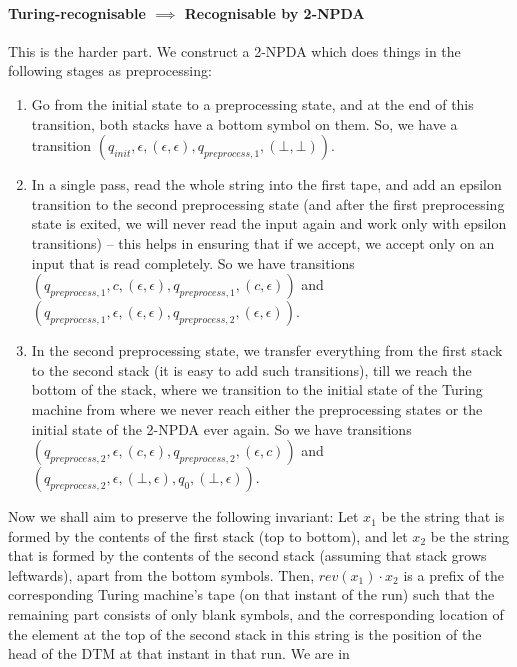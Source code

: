 \begin{soln}
    \paragraph{Turing-recognisable $\implies$ Recognisable by 2-NPDA} This is the harder part. We construct a 2-NPDA which does things in the following stages as preprocessing:
    \begin{enumerate}
        \item Go from the initial state to a preprocessing state, and at the end of this transition, both stacks have a bottom symbol on them.
            So, we have a transition $(q_{init}, \epsilon, (\epsilon, \epsilon), q_{preprocess, 1}, (\bot, \bot))$.
        \item In a single pass, read the whole string into the first tape, and add an epsilon transition to the second preprocessing state (and after the first preprocessing state is exited,
            we will never read the input again and work only with epsilon transitions) -- this helps in ensuring that if we
            accept, we accept only on an input that is read completely.
            So we have transitions $(q_{preprocess, 1}, c, (\epsilon, \epsilon), q_{preprocess, 1}, (c, \epsilon))$ and $(q_{preprocess, 1}, \epsilon, (\epsilon, \epsilon), q_{preprocess, 2},
            (\epsilon, \epsilon))$.
        \item In the second preprocessing state, we transfer everything from the first stack to the second stack (it is easy to add such transitions), till we reach the bottom of the stack, where we
            transition to the initial state of the Turing machine from where we never reach either the preprocessing states or the initial state of the 2-NPDA ever again. So we have
            transitions $(q_{preprocess, 2}, \epsilon, (c, \epsilon), q_{preprocess, 2}, (\epsilon, c))$ and $(q_{preprocess, 2}, \epsilon, (\bot, \epsilon), q_{0}, (\bot, \epsilon))$.
    \end{enumerate}
    Now we shall aim to preserve the following invariant:\nl
    Let $x_1$ be the string that is formed by the contents of the first stack (top to bottom), and let $x_2$ be the string that is formed by the contents of the second stack (assuming that stack grows
    leftwards), apart from the bottom symbols. Then, $rev(x_1) \cdot x_2$ is a prefix of the corresponding Turing machine's tape (on that instant of the run) such that the remaining part consists of
    only blank symbols, and the corresponding location of the element at the top of the second stack in this string is the position of the head of the DTM at that instant in that run. We are in

\end{soln}
